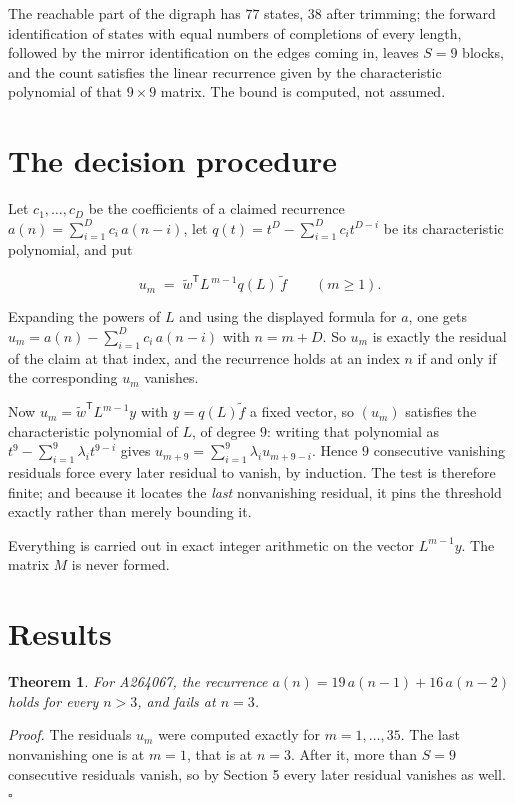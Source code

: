 \documentclass[11pt]{article}
\newtheorem{theorem}{Theorem}
\theoremstyle{definition}
\begin{document}
The reachable part of the digraph has $77$ states, $38$ after trimming; the forward identification of states with equal numbers of completions of every length, followed by the mirror identification on the edges coming in, leaves $S = 9$ blocks, and the count satisfies the linear recurrence given by the characteristic polynomial of that $9\times9$ matrix. The bound is computed, not assumed.

\section{The decision procedure}

Let $c_1,\dots,c_D$ be the coefficients of a claimed recurrence $a(n) = \sum_{i=1}^{D} c_i\,a(n-i)$, let $q(t) = t^{D} - \sum_{i=1}^{D} c_i t^{D-i}$ be its characteristic polynomial, and put

\[u_m \;=\; \tilde w^{\mathsf T} L^{\,m-1} q(L)\,\tilde f \qquad (m \ge 1).\]

Expanding the powers of $L$ and using the displayed formula for $a$, one gets $u_m = a(n) - \sum_{i=1}^{D} c_i\,a(n-i)$ with $n = m + D$. So $u_m$ is exactly the residual of the claim at that index, and the recurrence holds at an index $n$ if and only if the corresponding $u_m$ vanishes.

Now $u_m = \tilde w^{\mathsf T} L^{m-1} y$ with $y = q(L)\tilde f$ a fixed vector, so $(u_m)$ satisfies the characteristic polynomial of $L$, of degree $9$: writing that polynomial as $t^{9} - \sum_{i=1}^{9} \lambda_i t^{9-i}$ gives $u_{m+9} = \sum_{i=1}^{9} \lambda_i u_{m+9-i}$. Hence $9$ consecutive vanishing residuals force every later residual to vanish, by induction. The test is therefore finite; and because it locates the {\itshape last} nonvanishing residual, it pins the threshold exactly rather than merely bounding it.

Everything is carried out in exact integer arithmetic on the vector $L^{m-1}y$. The matrix $M$ is never formed.

\section{Results}

\begin{theorem} For A264067, the recurrence $a(n) = 19\,a(n-1) + 16\,a(n-2)$ holds for every $n > 3$, and fails at $n = 3$.\end{theorem}

{\itshape Proof.} The residuals $u_m$ were computed exactly for $m = 1,\dots,35$. The last nonvanishing one is at $m = 1$, that is at $n = 3$. After it, more than $S = 9$ consecutive residuals vanish, so by Section 5 every later residual vanishes as well. $\square$
\end{document}
